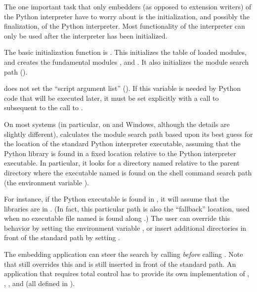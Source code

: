 \documentclass{manual}
\begin{document}
The one important task that only embedders (as opposed to extension
writers) of the Python interpreter have to worry about is the
initialization, and possibly the finalization, of the Python
interpreter.  Most functionality of the interpreter can only be used
after the interpreter has been initialized.

The basic initialization function is
.
This initializes the table of loaded modules, and creates the
fundamental modules ,
 and 
.  It also initializes the module
search path ().%

 does not set the ``script argument list'' 
().  If this variable is needed by Python code that 
will be executed later, it must be set explicitly with a call to 
 subsequent to the call to
.

On most systems (in particular, on \UNIX{} and Windows, although the
details are slightly different),
 calculates the module search path based
upon its best guess for the location of the standard Python
interpreter executable, assuming that the Python library is found in a
fixed location relative to the Python interpreter executable.  In
particular, it looks for a directory named
 relative to the parent directory where
the executable named  is found on the shell command
search path (the environment variable ).

For instance, if the Python executable is found in
, it will assume that the libraries are in
.  (In fact, this particular path
is also the ``fallback'' location, used when no executable file named
 is found along .)  The user can override
this behavior by setting the environment variable ,
or insert additional directories in front of the standard path by
setting .

The embedding application can steer the search by calling 
 \emph{before} calling 
.  Note that  still
overrides this and  is still inserted in front of
the standard path.  An application that requires total control has to
provide its own implementation of
,
,
, and
 (all
defined in ).
\end{document}
